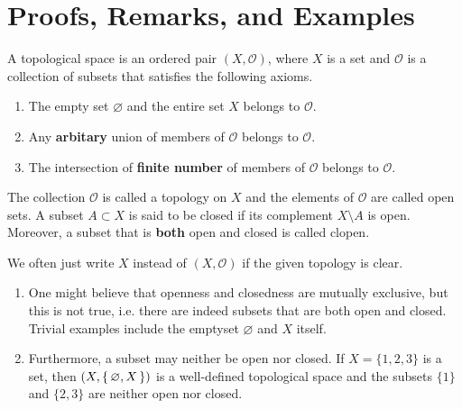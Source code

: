\section{Proofs, Remarks, and Examples}
%
\begin{defbox}
    \begin{definition}
        A {\color{maththen}topological space} is an {\color{mathobj}ordered pair} \((X, \mathcal{O})\), where \(X\) is a {\color{mathif}set} and \(\mathcal{O}\) is a {\color{mathif}collection of subsets} that satisfies the following {\color{mathrem}axioms}.
        \begin{enumerate}
            \item The {\color{mathif}empty set} \(\varnothing\) and the {\color{mathif}entire set} \(X\) belongs to \(\mathcal{O}\).
            \item Any \textbf{arbitary} {\color{mathif}union} of members of \(\mathcal{O}\) belongs to \(\mathcal{O}\).
            \item The {\color{mathif}intersection} of \textbf{finite number} of members of \(\mathcal{O}\) belongs to \(\mathcal{O}\).
        \end{enumerate}
        
        The {\color{mathobj}collection} \(\mathcal{O}\) is called a {\color{maththen}topology} on \(X\) and the {\color{mathobj}elements} of \(\mathcal{O}\) are called {\color{maththen}open sets}. A {\color{mathobj}subset} \(A \subset X\) is said to be {\color{maththen}closed} if its {\color{mathif}complement} \(X \setminus A\) is {\color{mathif}open}. Moreover, a {\color{mathobj}subset} that is \textbf{both} {\color{mathif}open} and {\color{mathif}closed} is called {\color{maththen}clopen}.
    \end{definition}
\end{defbox}
%
\begin{rembox}
    \begin{remark}
        We often just write \(X\) instead of \((X, \mathcal{O})\) if the given topology is clear.
    \end{remark}
\end{rembox}
%
\begin{rembox}
    \begin{remark}
        \begin{enumerate}
            \item One might believe that openness and closedness are mutually exclusive, but this is not true, i.e. there are indeed subsets that are both open and closed. Trivial examples include the emptyset \(\varnothing\) and \(X\) itself.
            \item Furthermore, a subset may neither be open nor closed. If \(X = \{1, 2, 3\}\) is a set, then \((X, \left\{\, \varnothing, X \,\right\})\) is a well-defined topological space and the subsets \(\{1\}\) and \(\{2, 3\}\) are neither open nor closed.
        \end{enumerate}
    \end{remark}
\end{rembox}
